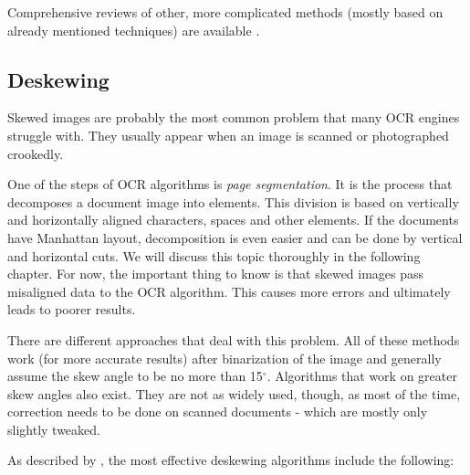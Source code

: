 Comprehensive reviews of other, more complicated methods (mostly based on already mentioned techniques) are available \citet{localOtherBin}.

\subsection{Deskewing}

Skewed images are probably the most common problem that many OCR engines struggle with. They usually appear when an image is scanned or photographed crookedly. 

One of the steps of OCR algorithms is \emph{page segmentation}. It is the process that decomposes a document image into elements. This division is based on vertically and horizontally aligned characters, spaces and other elements. If the documents have Manhattan layout, decomposition is even easier and can be done by vertical and horizontal cuts. We will discuss this topic thoroughly in the following chapter. For now, the important thing to know is that skewed images pass misaligned data to the OCR algorithm. This causes more errors and ultimately leads to poorer results.

There are different approaches that deal with this problem. All of these methods work (for more accurate results) after binarization of the image and generally assume the skew angle to be no more than 15$^{\circ}$. Algorithms that work on greater skew angles also exist\citep{skewAngleDetection}. They are not as widely used, though, as most of the time, correction needs to be done on scanned documents - which are mostly only slightly tweaked.

As described by \citet{skewBestTechniques}, the most effective deskewing algorithms include the following:

